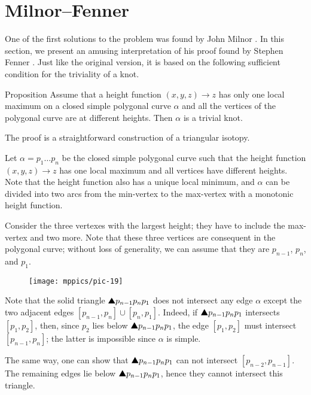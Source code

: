 \section{Milnor--Fenner}

One of the first solutions to the problem was found by John Milnor \cite{milnor}.
In this section, we present an amusing interpretation of his proof found by Stephen Fenner \cite{ferner}.
Just like the original version, it is based on the following sufficient condition for the triviality of a knot.

\begin{thm}{Proposition}\label{prop:one-max-one-min}
Assume that a height function $(x,y,z)\to z$ 
has only one local maximum on a closed simple polygonal curve $\alpha$ and all the vertices of the polygonal curve are at different heights.
Then $\alpha$ is a trivial knot.
\end{thm}

The proof is a straightforward construction of a triangular isotopy. 

Let $\alpha=p_1\dots p_n$ be the closed simple polygonal curve
such that the height function $(x,y,z)\to z$ has one local maximum and all vertices have different heights.
Note that the height function also has a unique local minimum,
and $\alpha$ can be divided into two arcs from the min-vertex to the max-vertex with a monotonic height function.

Consider the three vertexes with the largest height;
they have to include the max-vertex and two more.
Note that these three vertices are consequent in the polygonal curve; 
without loss of generality, we can assume that they are $p_{n-1}$, $p_n$, and $p_1$.

\begin{wrapfigure}{r}{30 mm}
\vskip-0mm
\centering
\texttt{[image: mppics/pic-19]}
\vskip0mm
\end{wrapfigure}

Note that the solid triangle $\solidtriangle p_{n-1}p_np_1$ does not intersect any edge $\alpha$ except the two adjacent edges $[p_{n-1},p_n]\cup[p_n,p_1]$.
Indeed, if $\solidtriangle p_{n-1}p_np_1$ intersects $[p_1,p_2]$,
then, 
since $p_2$ lies below $\solidtriangle p_{n-1}p_np_1$,
the edge $[p_1,p_2]$ must intersect $[p_{n-1},p_n]$;
the latter is impossible since $\alpha$ is simple.

The same way, one can show that $\solidtriangle p_{n-1}p_np_1$ can not intersect $[p_{n-2},p_{n-1}]$.
The remaining edges lie below $\solidtriangle p_{n-1}p_np_1$, hence they cannot intersect this triangle.

